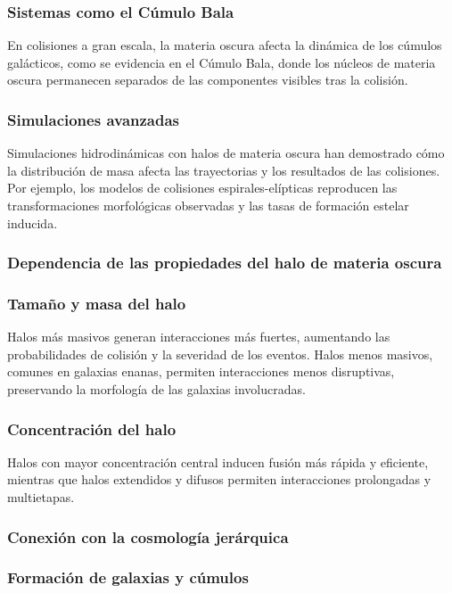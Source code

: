 \documentclass{article}
\begin{document}
\subsubsection*{Sistemas como el Cúmulo Bala}

En colisiones a gran escala, la materia oscura afecta la dinámica de los cúmulos galácticos, como se evidencia en el Cúmulo Bala, donde los núcleos de materia oscura permanecen separados de las componentes visibles tras la colisión.
\subsubsection*{Simulaciones avanzadas}

Simulaciones hidrodinámicas con halos de materia oscura han demostrado cómo la distribución de masa afecta las trayectorias y los resultados de las colisiones. Por ejemplo, los modelos de colisiones espirales-elípticas reproducen las transformaciones morfológicas observadas y las tasas de formación estelar inducida.
\subsubsection{Dependencia de las propiedades del halo de materia oscura}
\subsubsection*{Tamaño y masa del halo}

Halos más masivos generan interacciones más fuertes, aumentando las probabilidades de colisión y la severidad de los eventos.
Halos menos masivos, comunes en galaxias enanas, permiten interacciones menos disruptivas, preservando la morfología de las galaxias involucradas.
\subsubsection*{Concentración del halo}

Halos con mayor concentración central inducen fusión más rápida y eficiente, mientras que halos extendidos y difusos permiten interacciones prolongadas y multietapas.
\subsubsection{Conexión con la cosmología jerárquica}
\subsubsection*{Formación de galaxias y cúmulos}
\end{document}
